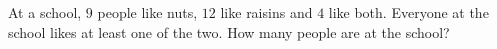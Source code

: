 At a school, $9$ people like nuts, $12$ like raisins and $4$ like both. Everyone at the school likes at least one of the two. How many people are at the school?
